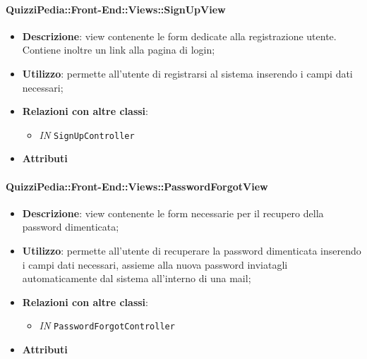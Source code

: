 \paragraph{QuizziPedia::Front-End::Views::SignUpView}
\begin{itemize}
	\item \textbf{Descrizione}: view contenente le form dedicate alla registrazione utente. Contiene inoltre un link alla pagina di login;
	\item \textbf{Utilizzo}: permette all'utente di registrarsi al sistema inserendo i campi dati necessari;
	\item \textbf{Relazioni con altre classi}:
	\begin{itemize}
		\item \textit{IN} \texttt{SignUpController} \\
	\end{itemize}
	\item \textbf{Attributi}
\end{itemize}

\paragraph{QuizziPedia::Front-End::Views::PasswordForgotView}
\begin{itemize}
	\item \textbf{Descrizione}: view contenente le form necessarie per il recupero della password dimenticata;
	\item \textbf{Utilizzo}: permette all'utente di recuperare la password dimenticata inserendo i campi dati necessari, assieme alla nuova password inviatagli automaticamente dal sistema all'interno di una mail;
	\item \textbf{Relazioni con altre classi}:
	\begin{itemize}
		\item \textit{IN} \texttt{PasswordForgotController} \\
	\end{itemize}
	\item \textbf{Attributi}
\end{itemize}

